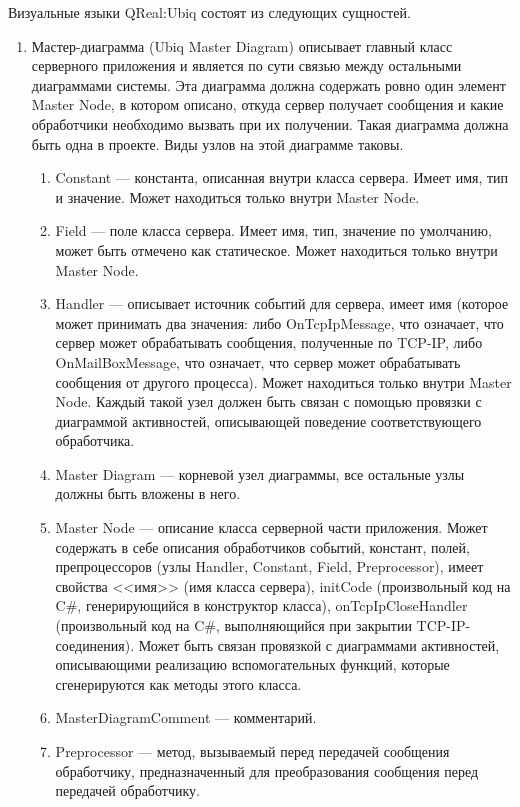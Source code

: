 Визуальные языки QReal:Ubiq состоят из следующих сущностей.
\begin{enumerate}
	\item Мастер-диаграмма (Ubiq Master Diagram) описывает главный класс серверного 
		приложения и является по сути связью между остальными диаграммами системы. Эта 
		диаграмма должна содержать ровно один элемент Master Node, в котором описано, 
		откуда сервер получает сообщения и какие обработчики необходимо вызвать при их 
		получении. Такая диаграмма должна быть одна в проекте. Виды узлов на этой диаграмме таковы.
		\begin{enumerate}
			\item Constant --- константа, описанная внутри класса сервера. Имеет имя, тип 
				и значение. Может находиться только внутри Master Node.
			\item Field --- поле класса сервера. Имеет имя, тип, значение по умолчанию, 
				может быть отмечено как статическое. Может находиться только внутри Master Node.
			\item Handler --- описывает источник событий для сервера, имеет имя (которое 
				может принимать два значения: либо OnTcpIpMessage, что означает, что сервер 
				может обрабатывать сообщения, полученные по TCP-IP, либо OnMailBoxMessage, 
				что означает, что сервер может обрабатывать сообщения от другого процесса). 
				Может находиться только внутри Master Node. Каждый такой узел должен быть 
				связан с помощью провязки с диаграммой активностей, описывающей поведение 
				соответствующего обработчика.
			\item Master Diagram --- корневой узел диаграммы, все остальные узлы должны 
				быть вложены в него.
			\item Master Node --- описание класса серверной части приложения. Может содержать 
				в себе описания обработчиков событий, констант, полей, препроцессоров (узлы 
				Handler, Constant, Field, Preprocessor), имеет свойства <<имя>> (имя класса 
				сервера), initCode (произвольный код на C\#, генерирующийся в конструктор класса), 
				onTcpIpCloseHandler (произвольный код на C\#, выполняющийся при закрытии TCP-IP-соединения). 
				Может быть связан провязкой с диаграммами активностей, описывающими реализацию 
				вспомогательных функций, которые сгенерируются как методы этого класса.
			\item MasterDiagramComment --- комментарий.
			\item Preprocessor --- метод, вызываемый перед передачей сообщения обработчику, 
				предназначенный для преобразования сообщения перед передачей обработчику. 

\end{enumerate}
\end{enumerate}
